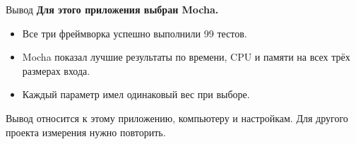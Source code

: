 \documentclass[aspectratio=169,11pt]{beamer}
\begin{document}
\begin{frame}{Вывод}
\textbf{Для этого приложения выбран Mocha.}
\begin{itemize}
\item Все три фреймворка успешно выполнили 99 тестов.
\item Mocha показал лучшие результаты по времени, CPU и памяти на всех трёх размерах входа.
\item Каждый параметр имел одинаковый вес при выборе.
\end{itemize}
\vspace{3mm}
Вывод относится к этому приложению, компьютеру и настройкам. Для другого проекта измерения нужно повторить.
\end{frame}
\end{document}
